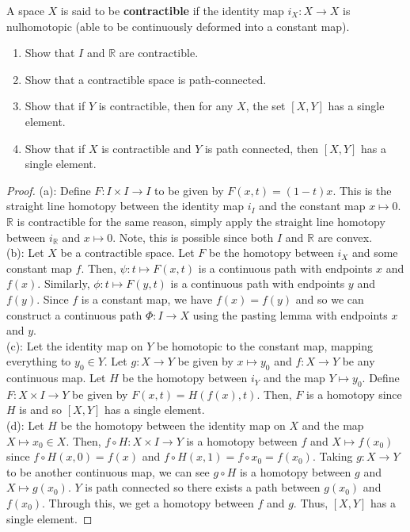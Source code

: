 \documentclass{article}
\begin{document}
A space $X$ is said to be \textbf{contractible} if the identity map $i_X: X\to X$ is nulhomotopic (able to be continuously deformed into a constant map).
\begin{enumerate}
	\item[(a)] Show that $I$ and $\mathbb{R}$ are contractible.
	\item[(b)] Show that a contractible space is path-connected.
	\item[(c)] Show that if $Y$ is contractible, then for any $X$, the set $[X,Y]$ has a single element.
	\item[(d)] Show that if $X$ is contractible and $Y$ is path connected, then $[X,Y]$ has a single element.
\end{enumerate}
\begin{proof}
	(a): Define $F: I\times I\to I$ to be given by $F(x,t) = (1-t)x$. This is the straight line homotopy between the identity map $i_I$ and the constant map $x\mapsto 0$.
	$\mathbb{R}$ is contractible for the same reason, simply apply the straight line homotopy between $i_{\mathbb{R}}$ and $x\mapsto 0$. Note, this is possible since both $I$ and 
	$\mathbb{R}$ are convex.\\
	
	(b): Let $X$ be a contractible space. Let $F$ be the homotopy between $i_X$ and some constant map $f$. Then, $\psi: t\mapsto F(x,t)$ is a continuous path with endpoints $x$ and $f(x)$.
	Similarly, $\phi: t\mapsto F(y,t)$ is a continuous path with endpoints $y$ and $f(y)$. Since $f$ is a constant map, we have $f(x)=f(y)$ and so we can construct a continuous path $\Phi: I\to X$
	using the pasting lemma with endpoints $x$ and $y$.\\
	
	(c): Let the identity map on $Y$ be homotopic to the constant map, mapping everything to $y_0\in Y$. Let $g: X\to Y$ be given by $x\mapsto y_0$ and $f: X\to Y$ be any continuous map.
	Let $H$ be the homotopy between $i_Y$ and the map $Y\mapsto y_0$. Define $F: X\times I \to Y$ be given by $F(x,t) = H(f(x),t)$. Then, $F$ is a homotopy since $H$ is and so $[X,Y]$ has
	a single element.\\
	
	(d): Let $H$ be the homotopy between the identity map on $X$ and the map $X\mapsto x_0\in X$. Then, $f\circ H: X\times I \to Y$ is a homotopy between $f$ and $X\mapsto f(x_0)$ since
	$f\circ H(x,0) = f(x)$ and $f\circ H(x,1) = f\circ x_0 = f(x_0)$. Taking $g: X\to Y$ to be another continuous map, we can see $g\circ H$ is a homotopy between $g$ and $X\mapsto g(x_0)$.
	$Y$ is path connected so there exists a path between $g(x_0)$ and $f(x_0)$. Through this, we get a homotopy between $f$ and $g$. Thus, $[X,Y]$ has a single element.
\end{proof}
\end{document}
